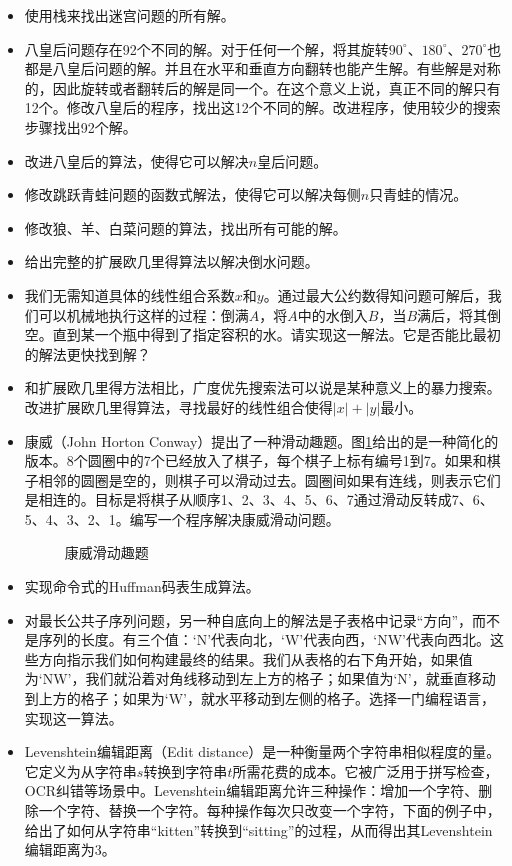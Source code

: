 \documentclass[UTF8]{article}
\begin{document}
\begin{Exercise}
\begin{itemize}
\item 使用栈来找出迷宫问题的所有解。
\item 八皇后问题存在92个不同的解。对于任何一个解，将其旋转$90^{\circ}$、$180^{\circ}$、$270^{\circ}$也都是八皇后问题的解。并且在水平和垂直方向翻转也能产生解。有些解是对称的，因此旋转或者翻转后的解是同一个。在这个意义上说，真正不同的解只有12个。修改八皇后的程序，找出这12个不同的解。改进程序，使用较少的搜索步骤找出92个解。
\item 改进八皇后的算法，使得它可以解决$n$皇后问题。
\item 修改跳跃青蛙问题的函数式解法，使得它可以解决每侧$n$只青蛙的情况。
\item 修改狼、羊、白菜问题的算法，找出所有可能的解。
\item 给出完整的扩展欧几里得算法以解决倒水问题。
\item 我们无需知道具体的线性组合系数$x$和$y$。通过最大公约数得知问题可解后，我们可以机械地执行这样的过程：倒满$A$，将$A$中的水倒入$B$，当$B$满后，将其倒空。直到某一个瓶中得到了指定容积的水。请实现这一解法。它是否能比最初的解法更快找到解？
\item 和扩展欧几里得方法相比，广度优先搜索法可以说是某种意义上的暴力搜索。改进扩展欧几里得算法，寻找最好的线性组合使得$|x| + |y|$最小。
\item 康威（John Horton Conway）提出了一种滑动趣题。图\ref{fig:conway7}给出的是一种简化的版本。8个圆圈中的7个已经放入了棋子，每个棋子上标有编号1到7。如果和棋子相邻的圆圈是空的，则棋子可以滑动过去。圆圈间如果有连线，则表示它们是相连的。目标是将棋子从顺序1、2、3、4、5、6、7通过滑动反转成7、6、5、4、3、2、1。编写一个程序解决康威滑动问题。
\begin{figure}[htbp]
 \centering
 
 \caption{康威滑动趣题}
 \label{fig:conway7}
\end{figure}
\item 实现命令式的Huffman码表生成算法。
\item 对最长公共子序列问题，另一种自底向上的解法是子表格中记录“方向”，而不是序列的长度。有三个值：‘N’代表向北，‘W’代表向西，‘NW’代表向西北。这些方向指示我们如何构建最终的结果。我们从表格的右下角开始，如果值为‘NW’，我们就沿着对角线移动到左上方的格子；如果值为‘N’，就垂直移动到上方的格子；如果为‘W’，就水平移动到左侧的格子。选择一门编程语言，实现这一算法。
\item Levenshtein编辑距离（Edit distance）是一种衡量两个字符串相似程度的量。它定义为从字符串$s$转换到字符串$t$所需花费的成本。它被广泛用于拼写检查，OCR纠错等场景中。Levenshtein编辑距离允许三种操作：增加一个字符、删除一个字符、替换一个字符。每种操作每次只改变一个字符，下面的例子中，给出了如何从字符串“kitten”转换到“sitting”的过程，从而得出其Levenshtein编辑距离为3。

\end{itemize}
\end{Exercise}
\end{document}
